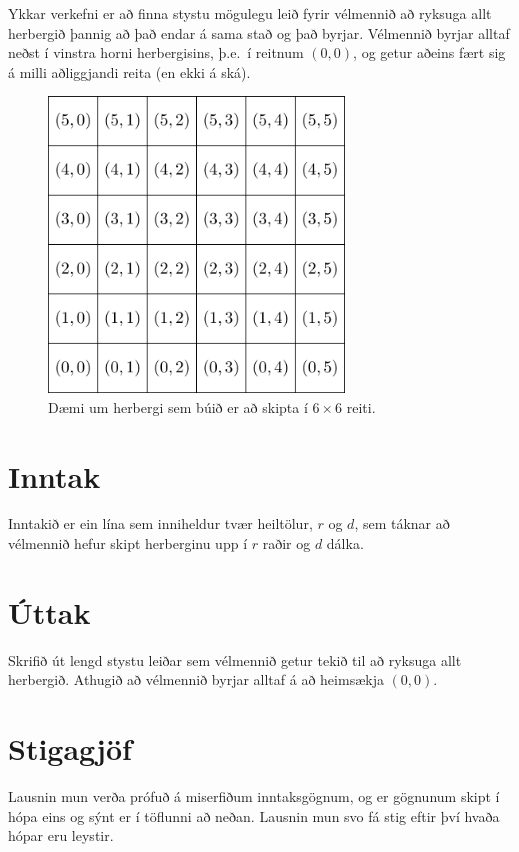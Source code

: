 Ykkar verkefni er að finna stystu mögulegu leið fyrir vélmennið að ryksuga allt
herbergið þannig að það endar á sama stað og það byrjar. Vélmennið byrjar
alltaf neðst í vinstra horni herbergisins, þ.e.\ í reitnum $(0,0)$, og getur
aðeins fært sig á milli aðliggjandi reita (en ekki á ská).

\begin{figure}[h!]
    \centering
    \includegraphics[width=0.7\textwidth]{layout.png}
    \caption{Dæmi um herbergi sem búið er að skipta í $6 \times 6$ reiti.} \label{fig:layout}
\end{figure}


\section*{Inntak}
Inntakið er ein lína sem inniheldur tvær heiltölur, $r$ og $d$, sem táknar að
vélmennið hefur skipt herberginu upp í $r$ raðir og $d$ dálka.


\section*{Úttak}
Skrifið út lengd stystu leiðar sem vélmennið getur tekið til að ryksuga allt
herbergið. Athugið að vélmennið byrjar alltaf á að heimsækja $(0,0)$.


\section*{Stigagjöf}
Lausnin mun verða prófuð á miserfiðum inntaksgögnum, og er gögnunum skipt í
hópa eins og sýnt er í töflunni að neðan. Lausnin mun svo fá stig eftir því
hvaða hópar eru leystir.

